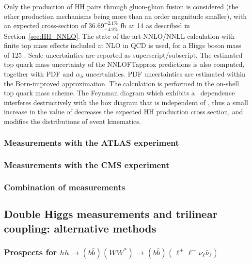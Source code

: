 \documentclass[../report.tex]{subfiles}
\providecommand{\main}{..}
\begin{document}
Only the production of HH pairs through gluon-gluon fusion is considered (the other production mechanisms being more than an order magnitude smaller), with an expected cross-section of 36.69$^{+2.1\%}_{-4.9\%}$ fb at 14 \UTeV as described in Section~\ref{sec:HH_NNLO}. The state of the art NNLO/NNLL calculation with finite top mass effects included at NLO in QCD is used, for a Higgs boson mass of 125 \UGeV. Scale uncertainties are reported as superscript/subscript. The estimated top quark mass uncertainty of the NNLOFTapprox predictions is also computed, together with PDF and $\alpha_{S}$ uncertainties. PDF uncertainties are estimated within the Born-improved approximation. The calculation is performed in the on-shell top quark mass scheme.
The Feynman diagram which exhibits a \lHHH\ dependence interferes destructively with the box diagram that is independent of \lHHH, thus a small increase in the value of \lHHH decreases the expected HH production cross section, and modifies the distributions of event kinematics.

\subsubsection{Measurements with the ATLAS experiment}
\label{sec:HH_ATLAS}



\subsubsection{Measurements with the CMS experiment}
\label{sec:HH_CMS}



\subsubsection{Combination of measurements}
\label{sec:HH_Combination}



\subsection{Double Higgs measurements and trilinear coupling: alternative methods}
\label{sec:HH_meas_th}

\subsubsection{Prospects for $hh \to (b \bar b)(WW^*) \to (b \bar b)( \ell^+\ell^- \nu_\ell \bar\nu_\ell)$}

\end{document}
